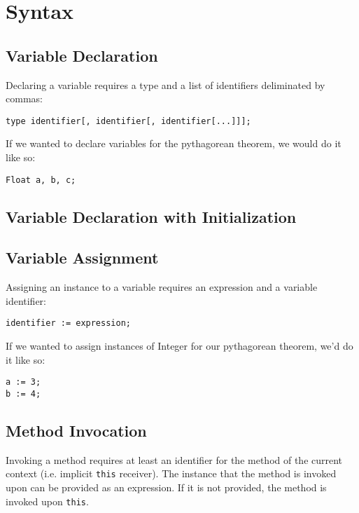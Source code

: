 \section{Syntax}
\subsection{Variable Declaration}
Declaring a variable requires a type and a list of identifiers deliminated by commas:

\begin{lstlisting}
type identifier[, identifier[, identifier[...]]];
\end{lstlisting}

If we wanted to declare variables for the pythagorean theorem, we would do it like so:

\begin{lstlisting}[caption=Variable Initialization for the Pythagorean Theorem]
Float a, b, c;
\end{lstlisting}

\subsection{Variable Declaration with Initialization}

\subsection{Variable Assignment}
Assigning an instance to a variable requires an expression and a variable identifier:

\begin{lstlisting}
identifier := expression;
\end{lstlisting}

If we wanted to assign instances of Integer for our pythagorean theorem, we'd do it like so:

\begin{lstlisting}[caption=Variable Assignment for the Pythagorean Theorem]
a := 3;
b := 4;
\end{lstlisting}

\subsection{Method Invocation}
Invoking a method requires at least an identifier for the method of the current context (i.e. implicit \verb!this! receiver). The instance that the method is invoked upon can be provided as an expression. If it is not provided, the method is invoked upon \verb!this!.

